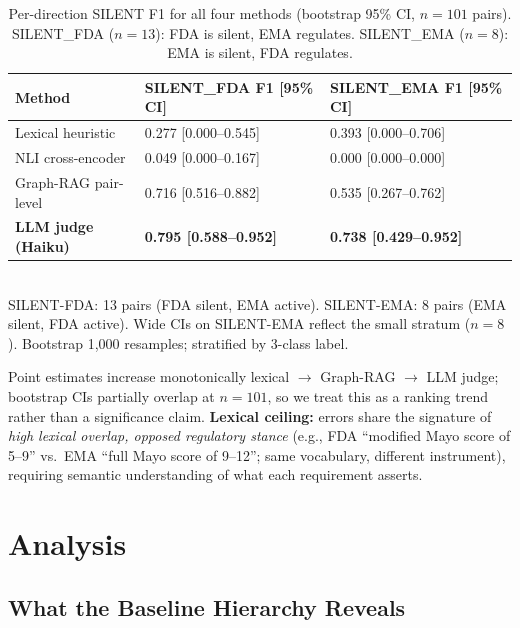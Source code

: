 \documentclass[manuscript]{acmart}
\begin{document}
\begin{table}[h]
  \caption{Per-direction SILENT F1 for all four methods (bootstrap 95\% CI,
    $n=101$ pairs). SILENT\_FDA ($n=13$): FDA is silent, EMA regulates.
    SILENT\_EMA ($n=8$): EMA is silent, FDA regulates.}
  \label{tab:silent_direction}
  \small
  \begin{tabular}{lll}
    \toprule
    Method & SILENT\_FDA F1 [95\% CI] & SILENT\_EMA F1 [95\% CI] \\
    \midrule
    Lexical heuristic
      & 0.277 [0.000--0.545] & 0.393 [0.000--0.706] \\
    NLI cross-encoder
      & 0.049 [0.000--0.167] & 0.000 [0.000--0.000] \\
    Graph-RAG pair-level
      & 0.716 [0.516--0.882] & 0.535 [0.267--0.762] \\
    \textbf{LLM judge (Haiku)}
      & \textbf{0.795 [0.588--0.952]} & \textbf{0.738 [0.429--0.952]} \\
    \bottomrule
  \end{tabular}
  \smallskip\\
  {\small SILENT-FDA: 13 pairs (FDA silent, EMA active). SILENT-EMA: 8 pairs
    (EMA silent, FDA active). Wide CIs on SILENT-EMA reflect the small stratum
    ($n=8$). Bootstrap 1{,}000 resamples; stratified by 3-class label.}
\end{table}

Point estimates increase monotonically lexical $\to$ Graph-RAG $\to$ LLM
judge; bootstrap CIs partially overlap at $n = 101$, so we treat this as a
ranking trend rather than a significance claim.
\textbf{Lexical ceiling:} errors share the signature of \textit{high lexical
overlap, opposed regulatory stance} (e.g., FDA ``modified Mayo score of
5--9'' vs.\ EMA ``full Mayo score of 9--12''; same vocabulary, different
instrument), requiring semantic understanding of what each requirement asserts.

\section{Analysis}
\label{sec:discussion}

\subsection{What the Baseline Hierarchy Reveals}
\end{document}
